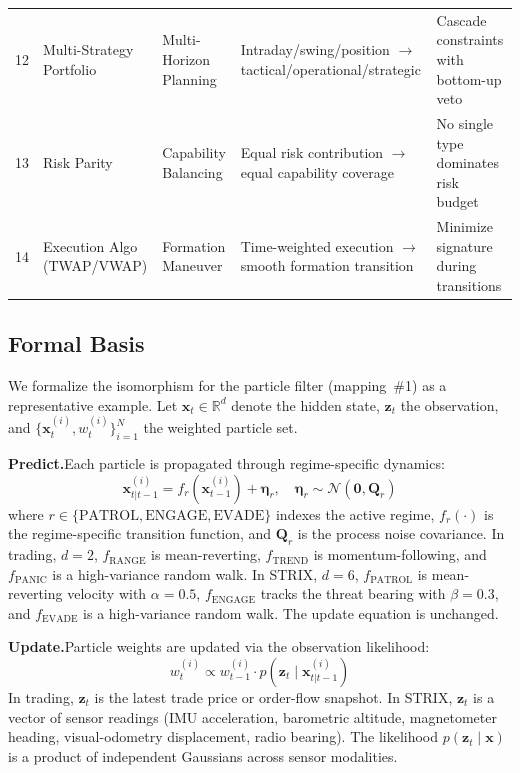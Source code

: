 \documentclass[conference]{IEEEtran}
\newcommand{\state}{\mathbf{x}}
\newcommand{\obs}{\mathbf{z}}
\newcommand{\weight}{w}
\newcommand{\R}{\mathbb{R}}
\begin{document}
\begin{table}[t]
\begin{tabular}{@{}clllp{5.0cm}@{}}
12 & Multi-Strategy Portfolio    & Multi-Horizon Planning         & Intraday/swing/position $\to$ tactical/operational/strategic & Cascade constraints with bottom-up veto \\
13 & Risk Parity                & Capability Balancing           & Equal risk contribution $\to$ equal capability coverage & No single type dominates risk budget \\
14 & Execution Algo (TWAP/VWAP) & Formation Maneuver             & Time-weighted execution $\to$ smooth formation transition & Minimize signature during transitions \\
\bottomrule
\end{tabular}
\end{table}

\subsection{Formal Basis}

We formalize the isomorphism for the particle filter (mapping~\#1) as
a representative example.  Let $\state_t\in\R^d$ denote the hidden
state, $\obs_t$ the observation, and $\{\state_t^{(i)},
\weight_t^{(i)}\}_{i=1}^{N}$ the weighted particle set.

\textbf{Predict.}\quad  Each particle is propagated through regime-specific dynamics:
\begin{equation}
\label{eq:predict}
  \state_{t|t-1}^{(i)} = f_r(\state_{t-1}^{(i)}) + \boldsymbol{\eta}_r, \quad
  \boldsymbol{\eta}_r \sim \mathcal{N}(\mathbf{0}, \mathbf{Q}_r)
\end{equation}
where $r\in\{\text{PATROL},\text{ENGAGE},\text{EVADE}\}$ indexes the
active regime, $f_r(\cdot)$ is the regime-specific transition function,
and $\mathbf{Q}_r$ is the process noise covariance.  In trading,
$d=2$, $f_{\text{RANGE}}$ is mean-reverting, $f_{\text{TREND}}$ is
momentum-following, and $f_{\text{PANIC}}$ is a high-variance random
walk.  In STRIX, $d=6$, $f_{\text{PATROL}}$ is mean-reverting
velocity with $\alpha=0.5$, $f_{\text{ENGAGE}}$ tracks the threat
bearing with $\beta=0.3$, and $f_{\text{EVADE}}$ is a high-variance
random walk.  The update equation is unchanged.

\textbf{Update.}\quad  Particle weights are updated via the
observation likelihood:
\begin{equation}
\label{eq:update}
  \weight_t^{(i)} \propto \weight_{t-1}^{(i)} \cdot
  p(\obs_t \mid \state_{t|t-1}^{(i)})
\end{equation}
In trading, $\obs_t$ is the latest trade price or order-flow snapshot.
In STRIX, $\obs_t$ is a vector of sensor readings (IMU acceleration,
barometric altitude, magnetometer heading, visual-odometry displacement,
radio bearing).  The likelihood $p(\obs_t\mid\state)$ is a product of
independent Gaussians across sensor modalities.
\end{document}
